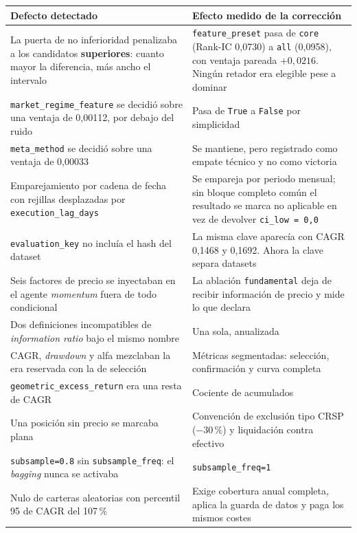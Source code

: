 \begin{tabularx}{\textwidth}{XX}
\toprule
Defecto detectado & Efecto medido de la corrección \\
\midrule
La puerta de no inferioridad penalizaba a los candidatos \textbf{superiores}: cuanto mayor la
diferencia, más ancho el intervalo &
\texttt{feature\_preset} pasa de \texttt{core} (Rank-IC 0,0730) a \texttt{all} (0,0958), con
ventaja pareada $+0{,}0216$. Ningún retador era elegible pese a dominar \\
\addlinespace
\texttt{market\_regime\_feature} se decidió sobre una ventaja de 0,00112, por debajo del ruido &
Pasa de \texttt{True} a \texttt{False} por simplicidad \\
\addlinespace
\texttt{meta\_method} se decidió sobre una ventaja de 0,00033 &
Se mantiene, pero registrado como empate técnico y no como victoria \\
\addlinespace
Emparejamiento por cadena de fecha con rejillas desplazadas por \texttt{execution\_lag\_days} &
Se empareja por periodo mensual; sin bloque completo común el resultado se marca no aplicable en
vez de devolver \texttt{ci\_low = 0,0} \\
\addlinespace
\texttt{evaluation\_key} no incluía el hash del dataset &
La misma clave aparecía con CAGR 0,1468 y 0,1692. Ahora la clave separa datasets \\
\addlinespace
Seis factores de precio se inyectaban en el agente \textit{momentum} fuera de todo condicional &
La ablación \texttt{fundamental} deja de recibir información de precio y mide lo que declara \\
\addlinespace
Dos definiciones incompatibles de \textit{information ratio} bajo el mismo nombre &
Una sola, anualizada \\
\addlinespace
CAGR, \textit{drawdown} y alfa mezclaban la era reservada con la de selección &
Métricas segmentadas: selección, confirmación y curva completa \\
\addlinespace
\texttt{geometric\_excess\_return} era una resta de CAGR &
Cociente de acumulados \\
\addlinespace
Una posición sin precio se marcaba plana &
Convención de exclusión tipo CRSP ($-30\,\%$) y liquidación contra efectivo \\
\addlinespace
\texttt{subsample=0.8} sin \texttt{subsample\_freq}: el \textit{bagging} nunca se activaba &
\texttt{subsample\_freq=1} \\
\addlinespace
Nulo de carteras aleatorias con percentil 95 de CAGR del 107\,\% &
Exige cobertura anual completa, aplica la guarda de datos y paga los mismos costes \\
\bottomrule
\end{tabularx}
